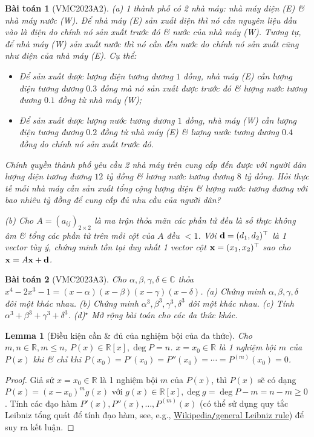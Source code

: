 \documentclass{article}
\newtheorem{baitoan}{Bài toán}
\newtheorem{lemma}{Lemma}
\begin{document}
\begin{baitoan}[VMC2023A2]
	(a) 1 thành phố có 2 nhà máy: nhà máy điện (E) \& nhà máy nước (W). Để nhà máy (E) sản xuất điện thì nó cần nguyên liệu đầu vào là điện do chính nó sản xuất trước đó \& nước của nhà máy (W). Tương tự, để nhà máy (W) sản xuất nước thì nó cần đến nước do chính nó sản xuất cũng như điện của nhà máy (E). Cụ thể:
	\begin{itemize}
		\item Để sản xuất được lượng điện tương đương $1$ đồng, nhà máy (E) cần lượng điện tương đương $0.3$ đồng mà nó sản xuất được trước đó \& lượng nước tương đương $0.1$ đồng từ nhà máy (W);
		\item Để sản xuất được lượng nước tương đương $1$ đồng, nhà máy (W) cần lượng điện tương đương $0.2$ đồng từ nhà máy (E) \& lượng nước tương đương $0.4$ đồng do chính nó sản xuất trước đó.
	\end{itemize}
	Chính quyền thành phố yêu cầu 2 nhà máy trên cung cấp đến được với người dân lượng điện tương đương $12$ tỷ đồng \& lương nước tương đương $8$ tỷ đồng. Hỏi thực tế mỗi nhà máy cần sản xuất tổng cộng lượng điện \& lượng nước tương đương với bao nhiêu tỷ đồng để cung cấp đủ nhu cầu của người dân?
	
	(b) Cho $A = (a_{ij})_{2\times2}$ là ma trận thỏa mãn các phần tử đều là số thực không âm \& tổng các phần tử trên mỗi cột của $A$ đều $< 1$. Với ${\bf d} = (d_1,d_2)^\top$ là 1 vector tùy ý, chứng minh tồn tại duy nhất 1 vector cột ${\bf x} = (x_1,x_2)^\top$ sao cho ${\bf x} = A{\bf x} + {\bf d}$.
\end{baitoan}

\begin{baitoan}[VMC2023A3]
	Cho $\alpha,\beta,\gamma,\delta\in\mathbb{C}$ thỏa $x^4 - 2x^3 - 1 = (x - \alpha)(x - \beta)(x - \gamma)(x - \delta)$. (a) Chứng minh $\alpha,\beta,\gamma,\delta$ đôi một khác nhau. (b) Chứng minh $\alpha^3,\beta^3,\gamma^3,\delta^3$ đôi một khác nhau. (c) Tính $\alpha^3 + \beta^3 + \gamma^3 +\delta^3$. (d)${}^\star$ Mở rộng bài toán cho các đa thức khác.
\end{baitoan}

\begin{lemma}[Điều kiện cần \& đủ của nghiệm bội của đa thức]
	Cho $m,n\in\mathbb{R},m\le n$, $P(x)\in\mathbb{R}[x],\deg P = n$. $x = x_0\in\mathbb{R}$ là 1 nghiệm bội $m$ của $P(x)$ khi \& chỉ khi $P(x_0) = P'(x_0) = P''(x_0) = \cdots = P^{(m)}(x_0) = 0$.
\end{lemma}

\begin{proof}
	Giả sử $x = x_0\in\mathbb{R}$ là 1 nghiệm bội $m$ của $P(x)$, thì $P(x)$ sẽ có dạng $P(x) = (x - x_0)^mg(x)$ với $g(x)\in\mathbb{R}[x],\deg g = \deg P - m = n - m\ge0$. Tính các đạo hàm $P'(x),P''(x),\ldots,P^{(m)}(x)$ (có thể sử dụng quy tắc Leibniz tổng quát để tính đạo hàm, see, e.g., \href{https://en.wikipedia.org/wiki/General_Leibniz_rule}{Wikipedia{\tt/}general Leibniz rule}) để suy ra kết luận.
\end{proof}
\end{document}
